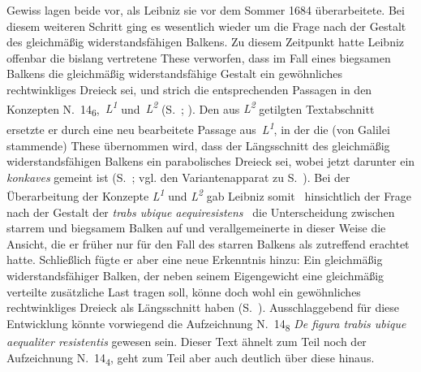 Gewiss lagen beide vor, als Leibniz sie vor dem Sommer 1684 überarbeitete.
\pend%
%
\pstart%
Bei diesem weiteren Schritt ging es wesentlich wieder um die Frage nach der Gestalt des gleichmäßig widerstandsfähigen Balkens.
Zu diesem Zeitpunkt hatte Leibniz offenbar die bislang vertretene These verworfen, dass im Fall eines biegsamen Balkens die gleichmäßig widerstandsfähige Gestalt ein gewöhnliches rechtwinkliges Dreieck sei, und strich die entsprechenden Passagen %
in den Konzepten N.~14\textsubscript{6},~\textit{L\textsuperscript{1}} und~\textit{L\textsuperscript{2}} (S.~; ).
Den aus \textit{L\textsuperscript{2}} getilgten Textabschnitt ersetzte er durch eine neu bearbeitete Passage aus~\textit{L\textsuperscript{1}}, in der die (von Galilei\protect{} stammende) These übernommen wird, dass der Längsschnitt des gleichmäßig widerstandsfähigen Balkens ein parabolisches Dreieck sei, wobei jetzt darunter ein \textit{konkaves} gemeint ist (S.~; vgl. den Variantenapparat zu S.~).
Bei der Überarbeitung der Konzepte \textit{L\textsuperscript{1}} und \textit{L\textsuperscript{2}} gab Leibniz somit \textendash\ hinsichtlich der Frage nach der Gestalt der \textit{trabs ubique aequiresistens} \textendash\ die Unterscheidung zwischen starrem und biegsamem Balken auf und verallgemeinerte in dieser Weise die Ansicht, die er früher nur für den Fall des starren Balkens als zutreffend erachtet hatte.
Schließlich fügte er aber eine neue Erkenntnis hinzu: Ein gleichmäßig widerstandsfähiger Balken, der neben seinem Eigengewicht eine gleichmäßig verteilte zusätzliche Last tragen soll, könne doch wohl ein gewöhnliches rechtwinkliges Dreieck als Längsschnitt haben (S.~).
\pend%
\pstart%
Ausschlaggebend für diese Entwicklung könnte vorwiegend die Aufzeichnung N.~14\textsubscript{8} \textit{De figura trabis ubique aequaliter resistentis} gewesen sein.
Dieser Text ähnelt zum Teil noch der Aufzeichnung N.~14\textsubscript{4}, geht zum Teil aber auch deutlich über diese hinaus.
